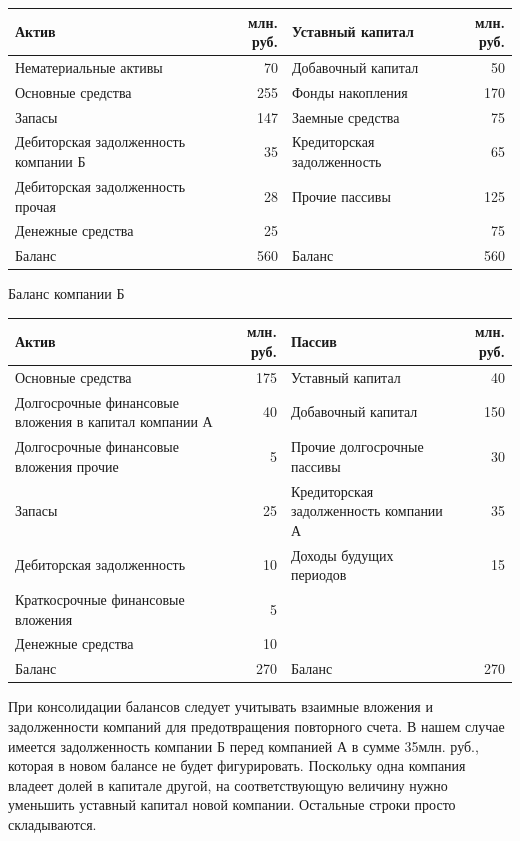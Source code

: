 \documentclass[12pt, table, a4paper,twoside]{exam}
\begin{document}
\begin{questions}
\begin{tabularx}{\linewidth}[b]{@{}>{\raggedright\arraybackslash}XrXr@{}}
	Актив                                & млн. руб. & Уставный капитал           & млн. руб. \\ \midrule
	Нематериальные активы                & 70  & Добавочный капитал         & 50  \\
	Основные средства                    & 255 & Фонды накопления           & 170 \\
	Запасы                               & 147 & Заемные средства           & 75  \\
	Дебиторская задолженность компании Б & 35  & Кредиторская задолженность & 65  \\
	Дебиторская задолженность прочая     & 28  & Прочие пассивы             & 125 \\
	Денежные средства                    & 25  &                            & 75  \\ \midrule
	Баланс                               & 560 & Баланс                     & 560 \\ \bottomrule
\end{tabularx}%

Баланс компании Б

\begin{tabularx}{\linewidth}[b]{@{}>{\raggedright\arraybackslash}XrXr@{}}	
	Актив &млн. руб. & Пассив &млн. руб. \\
	\midrule
	Основные средства  & 175   & Уставный капитал  & 40 \\
	Долгосрочные финансовые вложения в капитал компании А  & 40    & Добавочный капитал  & 150 \\
	Долгосрочные финансовые вложения прочие  & 5     & Прочие долгосрочные пассивы  & 30 \\
	Запасы  & 25    & Кредиторская задолженность компании А  & 35 \\
	Дебиторская задолженность  & 10    & Доходы будущих периодов  & 15 \\
	Краткосрочные финансовые вложения  & 5     &       &  \\
	Денежные средства  & 10    &       &  \\
	\midrule
	Баланс  & 270   & Баланс  & 270 \\
	\bottomrule
\end{tabularx}%


\begin{solution}[12em]
	
	\raggedright
	При консолидации балансов следует учитывать взаимные вложения и задолженности компаний для предотвращения повторного счета. В нашем случае имеется задолженность компании Б перед компанией А в сумме 35млн. руб., которая в новом балансе не будет фигурировать. Поскольку одна компания владеет долей в капитале другой, на соответствующую величину нужно уменьшить уставный капитал новой компании. Остальные 
	строки просто складываются.
	

\end{solution}
\end{questions}
\end{document}
